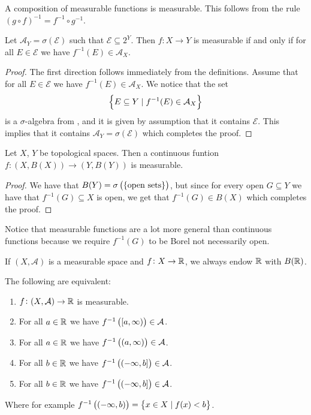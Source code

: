 \documentclass[11pt,a4paper]{article}
\newcommand{\A}{\mathcal A}
\begin{document}
\begin{remark}
  A composition of measurable functions is measurable.
  This follows from the rule $(g \circ f)^{-1} = f^{-1} \circ g^{-1}$.
\end{remark}

\begin{lemma}
  Let $\A_Y = \sigma(\mathcal E)$ such that $\mathcal E \subseteq 2^{Y}$.
  Then $f \colon X \to Y$ is measurable if and only if for all
  $E \in \mathcal E$ we have $f^{-1}(E) \in \A_X$.
\end{lemma}
\begin{proof}
  The first direction follows immediately from the definitions.
  Assume that for all $E \in \mathcal E$ we have $f^{-1}(E) \in \A_X$.
  We notice that the set
  \[
    \set{E \subseteq Y \mid f^{-1}(E) \in \A_X}
  \]
  is a $\sigma$-algebra from ,
  and it is given by assumption that it contains $\mathcal E$.
  This implies that it contains $\A_Y = \sigma(\mathcal E)$ which completes
  the proof.
\end{proof}

\begin{corollary}
  Let $X$, $Y$ be topological spaces.
  Then a continuous funtion $f \colon (X,B(X)) \to (Y,B(Y))$ is measurable.
\end{corollary}
\begin{proof}
  We have that $B(Y) = \sigma\del{\set{\text{open sets}}}$,
  but since for every open $G \subseteq Y$ we have that $f^{-1}(G) \subseteq X$
  is open, we get that $f^{-1}(G) \in B(X)$ which completes the proof.
\end{proof}

\begin{remark}
  Notice that measurable functions are a lot more general than continuous
  functions because we require $f^{-1}(G)$ to be Borel not necessarily open.
\end{remark}

\begin{remark}
  If $(X,\A)$ is a measurable space and $f \colon X \to \mathbb{R}$,
  we always endow $\mathbb{R}$ with $B(\mathbb{R})$.
\end{remark}

\begin{corollary}
  The following are equivalent:
  \begin{enumerate}
    \item[(1)] $f \colon (X,\A) \to \R$ is measurable.
    \item[(2)] For all $a \in \mathbb{R}$ we have $f^{-1}\del{[a,\infty)} \in \A$.
    \item[(3)] For all $a \in \mathbb{R}$ we have $f^{-1}\del{(a,\infty)} \in \A$.
    \item[(4)] For all $b \in \mathbb{R}$ we have $f^{-1}\del{(\ninfty,b]} \in \A$.
    \item[(5)] For all $b \in \mathbb{R}$ we have $f^{-1}\del{(\ninfty,b]} \in \A$.
  \end{enumerate}
  Where for example $f^{-1}\del{(\ninfty,b)} = \set{x \in X \mid f(x) < b}$.
\end{corollary}
\end{document}
